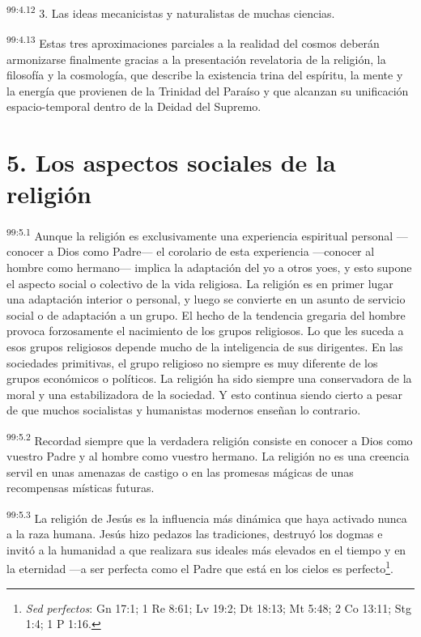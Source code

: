 \documentclass[twoside, 11pt]{book}
\begin{document}
\par
\textsuperscript{99:4.12} 3. Las ideas mecanicistas y naturalistas de muchas ciencias.

\par
\textsuperscript{99:4.13} Estas tres aproximaciones parciales a la realidad del cosmos deberán armonizarse finalmente gracias a la presentación revelatoria de la religión, la filosofía y la cosmología, que describe la existencia trina del espíritu, la mente y la energía que provienen de la Trinidad del Paraíso y que alcanzan su unificación espacio-temporal dentro de la Deidad del Supremo.

\section*{5. Los aspectos sociales de la religión}
\par
\textsuperscript{99:5.1} Aunque la religión es exclusivamente una experiencia espiritual personal ---conocer a Dios como Padre--- el corolario de esta experiencia ---conocer al hombre como hermano--- implica la adaptación del yo a otros yoes, y esto supone el aspecto social o colectivo de la vida religiosa. La religión es en primer lugar una adaptación interior o personal, y luego se convierte en un asunto de servicio social o de adaptación a un grupo. El hecho de la tendencia gregaria del hombre provoca forzosamente el nacimiento de los grupos religiosos. Lo que les suceda a esos grupos religiosos depende mucho de la inteligencia de sus dirigentes. En las sociedades primitivas, el grupo religioso no siempre es muy diferente de los grupos económicos o políticos. La religión ha sido siempre una conservadora de la moral y una estabilizadora de la sociedad. Y esto continua siendo cierto a pesar de que muchos socialistas y humanistas modernos enseñan lo contrario.

\par
\textsuperscript{99:5.2} Recordad siempre que la verdadera religión consiste en conocer a Dios como vuestro Padre y al hombre como vuestro hermano. La religión no es una creencia servil en unas amenazas de castigo o en las promesas mágicas de unas recompensas místicas futuras.

\par
\textsuperscript{99:5.3} La religión de Jesús es la influencia más dinámica que haya activado nunca a la raza humana. Jesús hizo pedazos las tradiciones, destruyó los dogmas e invitó a la humanidad a que realizara sus ideales más elevados en el tiempo y en la eternidad ---a ser perfecta como el Padre que está en los cielos es perfecto\footnote{\textit{Sed perfectos}: Gn 17:1; 1 Re 8:61; Lv 19:2; Dt 18:13; Mt 5:48; 2 Co 13:11; Stg 1:4; 1 P 1:16.}.
\end{document}
